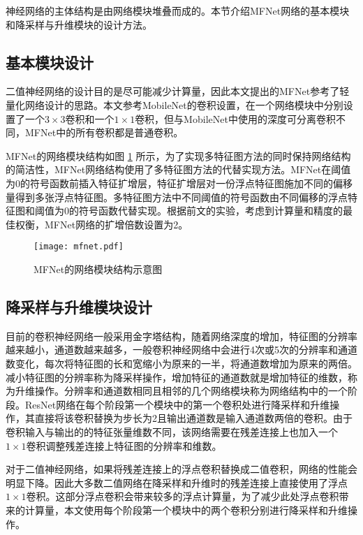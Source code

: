 神经网络的主体结构是由网络模块堆叠而成的。本节介绍MFNet网络的基本模块和降采样与升维模块的设计方法。

\subsection{基本模块设计}

二值神经网络的设计目的是尽可能减少计算量，因此本文提出的MFNet参考了轻量化网络设计的思路。本文参考MobileNet\cite{mobilenet}的卷积设置，在一个网络模块中分别设置了一个$3 \times 3$卷积和一个$1 \times 1$卷积，但与MobileNet中使用的深度可分离卷积不同，MFNet中的所有卷积都是普通卷积。

MFNet的网络模块结构如图 \ref{fig:mfnet} 所示，为了实现多特征图方法的同时保持网络结构的简洁性，MFNet网络结构使用了多特征图方法的代替实现方法。MFNet在阈值为0的符号函数前插入特征扩增层，特征扩增层对一份浮点特征图施加不同的偏移量得到多张浮点特征图。多特征图方法中不同阈值的符号函数由不同偏移的浮点特征图和阈值为0的符号函数代替实现。根据前文的实验，考虑到计算量和精度的最佳权衡，MFNet网络的扩增倍数设置为2。

\begin{figure}[htb]
  \centering
  \texttt{[image: mfnet.pdf]}
  \caption{MFNet的网络模块结构示意图}
  \label{fig:mfnet}
\end{figure}

\subsection{降采样与升维模块设计}

目前的卷积神经网络一般采用金字塔结构，随着网络深度的增加，特征图的分辨率越来越小，通道数越来越多，一般卷积神经网络中会进行4次或5次的分辨率和通道数变化，每次将特征图的长和宽缩小为原来的一半，将通道数增加为原来的两倍。减小特征图的分辨率称为降采样操作，增加特征的通道数就是增加特征的维数，称为升维操作。分辨率和通道数相同且相邻的几个网络模块称为网络结构中的一个阶段。ResNet\cite{resnet}网络在每个阶段第一个模块中的第一个卷积处进行降采样和升维操作，其直接将该卷积替换为步长为2且输出通道数是输入通道数两倍的卷积。由于卷积输入与输出的的特征张量维数不同，该网络需要在残差连接上也加入一个$1 \times 1$卷积调整残差连接上特征图的分辨率和维数。

对于二值神经网络，如果将残差连接上的浮点卷积替换成二值卷积，网络的性能会明显下降。因此大多数二值网络在降采样和升维时的残差连接上直接使用了浮点$1 \times 1$卷积。这部分浮点卷积会带来较多的浮点计算量，为了减少此处浮点卷积带来的计算量，本文使用每个阶段第一个模块中的两个卷积分别进行降采样和升维操作。

